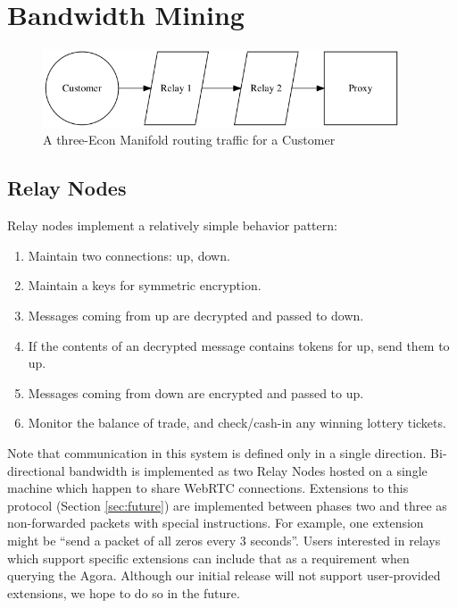\documentclass{article}
\begin{document}
\section{Bandwidth Mining}
\label{sec:mining}

\begin{figure}[htbp]
  \centering
  \includegraphics[width = 300pt]{sttc}
  \caption{A three-Econ Manifold routing traffic for a Customer}
\end{figure}

\subsection{Relay Nodes}

Relay nodes implement a relatively simple behavior pattern:

\begin{enumerate}
    \item Maintain two connections: up, down.
    \item Maintain a keys for symmetric encryption.
    \item Messages coming from up are decrypted and passed to down.
    \item If the contents of an decrypted message contains tokens for up, send them to up.
    \item Messages coming from down are encrypted and passed to up.
    \item Monitor the balance of trade, and check/cash-in any winning lottery tickets.
\end{enumerate}

Note that communication in this system is defined only in a single direction. Bi-directional bandwidth is implemented as two Relay Nodes hosted on a single machine which happen to share WebRTC connections. Extensions to this protocol (Section \ref{sec:future}) are implemented between phases two and three as non-forwarded packets with special instructions. For example, one extension might be “send a packet of all zeros every 3 seconds”. Users interested in relays which support specific extensions can include that as a requirement when querying the Agora. Although our initial release will not support user-provided extensions, we hope to do so in the future.
\end{document}
